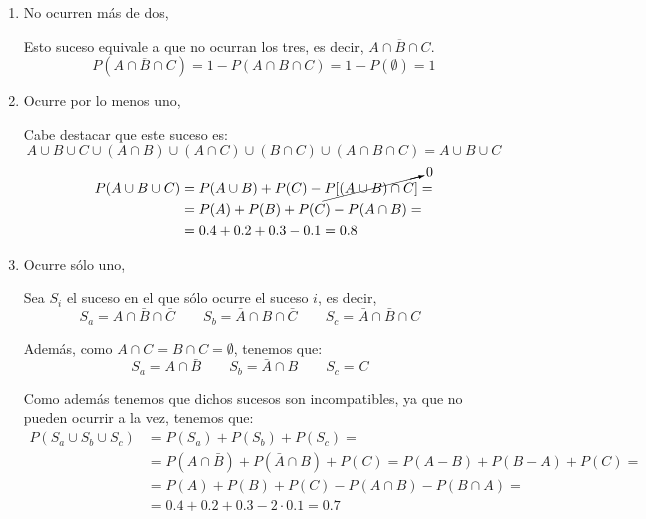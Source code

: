 \begin{ejercicio}
\begin{enumerate}
        \item No ocurren más de dos,
        
        Esto suceso equivale a que no ocurran los tres, es decir, $\overline{A\cap B \cap C}$.
        \begin{equation*}
            P\left(\overline{A\cap B \cap C}\right) = 1-P({A\cap B \cap C}) = 1-P(\emptyset) = 1
        \end{equation*}
        
        \item Ocurre por lo menos uno,

        Cabe destacar que este suceso es:
        \begin{equation*}
            A\cup B \cup C \cup (A\cap B) \cup (A\cap C) \cup (B\cap C) \cup (A\cap B \cap C) = A\cup B \cup C
        \end{equation*}
        \begin{equation}\label{Ej2.g}\begin{split}
            P(A\cup B \cup C) &= P(A\cup B) + P(C) - \cancelto{0}{P[(A\cup B) \cap C]}
            =\\&
            = P(A) + P(B) + P(C) - P(A\cap B)
            =\\&
            = 0.4 + 0.2 + 0.3 - 0.1 = 0.8
        \end{split}\end{equation}
        
        \item Ocurre sólo uno,

        Sea $S_i$ el suceso en el que sólo ocurre el suceso $i$, es decir,
        \begin{equation*}
            S_a = A\cap \bar{B} \cap \bar{C}
            \qquad
            S_b = \bar{A} \cap {B} \cap \bar{C}
            \qquad
            S_c = \bar{A} \cap \bar{B} \cap {C}
            \qquad
        \end{equation*}

        Además, como $A\cap C = B\cap C = \emptyset$, tenemos que:
        \begin{equation*}
            S_a = A\cap \bar{B}
            \qquad
            S_b = \bar{A} \cap {B}
            \qquad
            S_c = {C}
            \qquad
        \end{equation*}

        Como además tenemos que dichos sucesos son incompatibles, ya que no pueden ocurrir a la vez, tenemos que:
        \begin{equation*}\begin{split}
            P(S_a \cup S_b \cup S_c) &= P(S_a) + P(S_b) + P(S_c) 
            =\\&= P(A\cap \bar{B}) + P(\bar{A}\cap B) + P(C) 
            = P(A-B) + P(B-A) + P(C)
            =\\&= P(A) + P(B) + P(C) - P(A\cap B) - P(B\cap A) =\\&= 0.4+0.2+0.3 -2\cdot 0.1 = 0.7
        \end{split}\end{equation*}
        

\end{enumerate}
\end{ejercicio}
